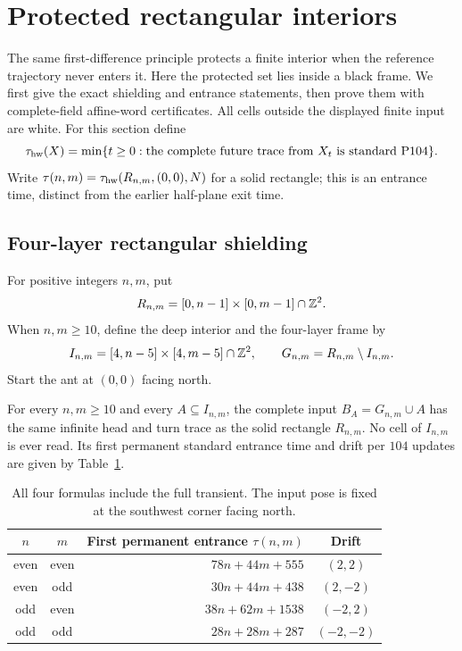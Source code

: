 \section{Protected rectangular interiors}\label{sec:frames}
The same first-difference principle protects a finite interior when the
reference trajectory never enters it. Here the protected set lies inside a
black frame. We first give the exact shielding and entrance statements, then
prove them with complete-field affine-word certificates. All cells outside the
displayed finite input are white. For this section define
\[
 \tau_{\rm hw}(X)=\min\{t\ge0:\text{the complete future trace from }X_t
                         \text{ is standard P104}\}.
\]
Write $\tau(n,m)=\tau_{\rm hw}(R_{n,m},(0,0),N)$ for a solid rectangle;
this is an entrance time, distinct from the earlier half-plane exit time.
\subsection{Four-layer rectangular shielding}
For positive integers $n,m$, put
\[
 R_{n,m}=[0,n-1]\times[0,m-1]\cap\mathbb Z^2.
\]
When $n,m\ge10$, define the deep interior and the four-layer frame by
\[
 I_{n,m}=[4,n-5]\times[4,m-5]\cap\mathbb Z^2,
 \qquad G_{n,m}=R_{n,m}\setminus I_{n,m}.
\]
Start the ant at $(0,0)$ facing north.

\begin{theorem}\label{frame:thm:frame}
For every $n,m\ge10$ and every $A\subseteq I_{n,m}$, the complete input $B_A=G_{n,m}\cup A$ has the same infinite head and turn trace as the solid rectangle $R_{n,m}$. No cell of $I_{n,m}$ is ever read. Its first permanent standard entrance time and drift per $104$ updates are given by Table~\ref{frame:tab:four}.
\end{theorem}
\begin{table}[ht]
\centering
\small\begin{tabular}{ccrc}
\toprule
$n$ & $m$ & First permanent entrance $\tau(n,m)$ & Drift \\
\midrule
even & even & $78n+44m+555$ & $(2,2)$ \\
even & odd & $30n+44m+438$ & $(2,-2)$ \\
odd & even & $38n+62m+1538$ & $(-2,2)$ \\
odd & odd & $28n+28m+287$ & $(-2,-2)$ \\
\bottomrule
\end{tabular}
\caption{All four formulas include the full transient. The input pose is fixed at the southwest corner facing north.}\label{frame:tab:four}
\end{table}

